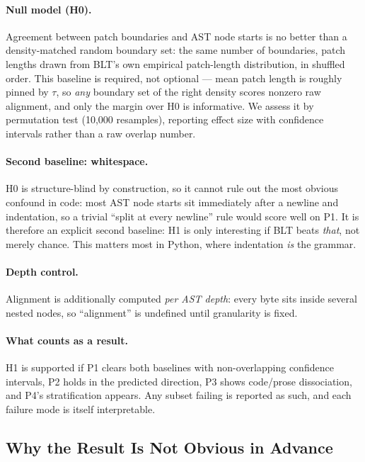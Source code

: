 \paragraph{Null model (H0).} Agreement between patch boundaries and AST node starts is no
better than a density-matched random boundary set: the same number of boundaries, patch
lengths drawn from BLT's own empirical patch-length distribution, in shuffled order. This
baseline is required, not optional --- mean patch length is roughly pinned by $\tau$, so
\emph{any} boundary set of the right density scores nonzero raw alignment, and only the
margin over H0 is informative. We assess it by permutation test (10{,}000 resamples),
reporting effect size with confidence intervals rather than a raw overlap number.

\paragraph{Second baseline: whitespace.} H0 is structure-blind by construction, so it cannot
rule out the most obvious confound in code: most AST node starts sit immediately after a
newline and indentation, so a trivial ``split at every newline'' rule would score well on
P1. It is therefore an explicit second baseline: H1 is only interesting if BLT beats \emph{that},
not merely chance. This matters most in Python, where indentation \emph{is} the
grammar.

\paragraph{Depth control.} Alignment is additionally computed \emph{per AST depth}: every
byte sits inside several nested nodes, so ``alignment'' is undefined until granularity is
fixed.

\paragraph{What counts as a result.} H1 is supported if P1 clears both baselines with
non-overlapping confidence intervals, P2 holds in the predicted direction, P3 shows
code/prose dissociation, and P4's stratification appears. Any subset failing is reported as
such, and each failure mode is itself interpretable.

\subsection{Why the Result Is Not Obvious in Advance}
\label{sec:notobvious}

